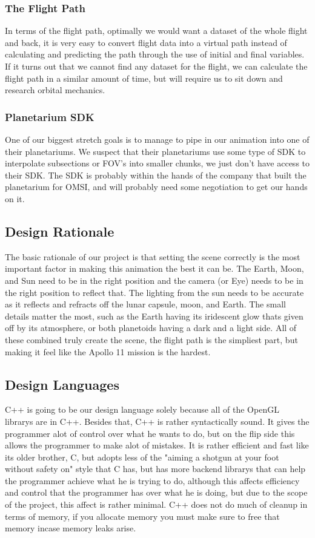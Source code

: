 \documentclass[onecolumn, draftclsnofoot,10pt, compsoc]{IEEEtran}
\begin{document}
	\subsubsection{The Flight Path}
	In terms of the flight path, optimally we would want a dataset of the whole flight and back, it is very easy to convert flight data into a virtual path instead of calculating and predicting the path through the use of initial and final variables. If it turns out that we cannot find any dataset for the flight, we can calculate the flight path in a similar amount of time, but will require us to sit down and research orbital mechanics. 
	
	\subsubsection{Planetarium SDK}
	One of our biggest stretch goals is to manage to pipe in our animation into one of their planetariums. We suspect that their planetariums use some type of SDK to interpolate subsections or FOV's into smaller chunks, we just don't have access to their SDK. The SDK is probably within the hands of the company that built the planetarium for OMSI, and will probably need some negotiation to get our hands on it. 
    
    \subsection{Design Rationale}
	The basic rationale of our project is that setting the scene correctly is the most important factor in making this animation the best it can be. The Earth, Moon, and Sun need to be in the right position and the camera (or Eye) needs to be in the right position to reflect that. The lighting from the sun needs to be accurate as it reflects and refracts off the lunar capsule, moon, and Earth. The small details matter the most, such as the Earth having its iridescent glow thats given off by its atmosphere, or both planetoids having a dark and a light side. All of these combined truly create the scene, the flight path is the simpliest part, but making it feel like the Apollo 11 mission is the hardest.
    \subsection{Design Languages}
	C++ is going to be our design language solely because all of the OpenGL librarys are in C++. Besides that, C++ is rather syntactically sound. It gives the programmer alot of control over what he wants to do, but on the flip side this allows the programmer to make alot of mistakes. It is rather efficient and fast like its older brother, C, but adopts less of the "aiming a shotgun at your foot without safety on" style that C has, but has more backend librarys that can help the programmer achieve what he is trying to do, although this affects efficiency and control that the programmer has over what he is doing, but due to the scope of the project, this affect is rather minimal. C++ does not do much of cleanup in terms of memory, if you allocate memory you must make sure to free that memory incase memory leaks arise. 
\end{document}
